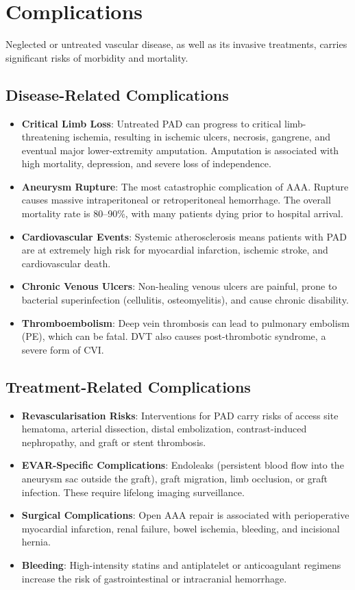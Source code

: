\section*{Complications}
Neglected or untreated vascular disease, as well as its invasive treatments, carries significant risks of morbidity and mortality.

\subsection*{Disease-Related Complications}
\begin{itemize}
    \item \textbf{Critical Limb Loss}: Untreated PAD can progress to critical limb-threatening ischemia, resulting in ischemic ulcers, necrosis, gangrene, and eventual major lower-extremity amputation. Amputation is associated with high mortality, depression, and severe loss of independence.
    \item \textbf{Aneurysm Rupture}: The most catastrophic complication of AAA. Rupture causes massive intraperitoneal or retroperitoneal hemorrhage. The overall mortality rate is 80--90\%, with many patients dying prior to hospital arrival.
    \item \textbf{Cardiovascular Events}: Systemic atherosclerosis means patients with PAD are at extremely high risk for myocardial infarction, ischemic stroke, and cardiovascular death.
    \item \textbf{Chronic Venous Ulcers}: Non-healing venous ulcers are painful, prone to bacterial superinfection (cellulitis, osteomyelitis), and cause chronic disability.
    \item \textbf{Thromboembolism}: Deep vein thrombosis can lead to pulmonary embolism (PE), which can be fatal. DVT also causes post-thrombotic syndrome, a severe form of CVI.
\end{itemize}

\subsection*{Treatment-Related Complications}
\begin{itemize}
    \item \textbf{Revascularisation Risks}: Interventions for PAD carry risks of access site hematoma, arterial dissection, distal embolization, contrast-induced nephropathy, and graft or stent thrombosis.
    \item \textbf{EVAR-Specific Complications}: Endoleaks (persistent blood flow into the aneurysm sac outside the graft), graft migration, limb occlusion, or graft infection. These require lifelong imaging surveillance.
    \item \textbf{Surgical Complications}: Open AAA repair is associated with perioperative myocardial infarction, renal failure, bowel ischemia, bleeding, and incisional hernia.
    \item \textbf{Bleeding}: High-intensity statins and antiplatelet or anticoagulant regimens increase the risk of gastrointestinal or intracranial hemorrhage.
\end{itemize}


